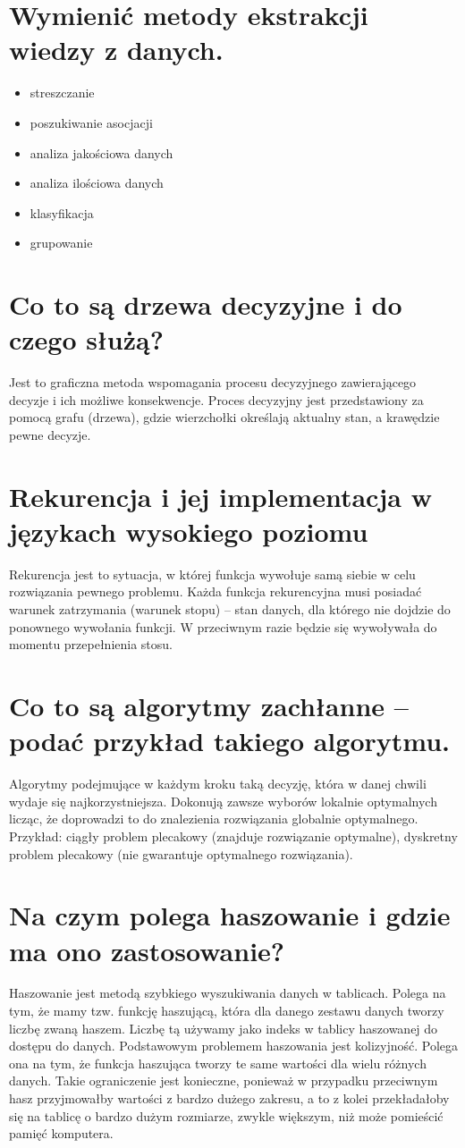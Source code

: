 \documentclass[12pt,a4paper]{article}
\begin{document}
	\section{Wymienić metody ekstrakcji wiedzy z danych.}
	\begin{itemize}
		\item streszczanie
		\item poszukiwanie asocjacji
		\item analiza jakościowa danych
		\item analiza ilościowa danych
		\item klasyfikacja
		\item grupowanie
	\end{itemize}

	\section{Co to są drzewa decyzyjne i do czego służą?}
	Jest to graficzna metoda wspomagania procesu decyzyjnego zawierającego decyzje i ich możliwe konsekwencje. Proces decyzyjny jest przedstawiony za pomocą grafu (drzewa), gdzie wierzchołki określają aktualny stan, a krawędzie pewne decyzje.

	\section{Rekurencja i jej implementacja w językach wysokiego poziomu}
	Rekurencja jest to sytuacja, w której funkcja wywołuje samą siebie w celu rozwiązania pewnego problemu. Każda funkcja rekurencyjna musi posiadać warunek zatrzymania (warunek stopu) – stan danych, dla którego nie dojdzie do ponownego wywołania funkcji. W przeciwnym razie będzie się wywoływała do momentu przepełnienia stosu.

	\section{Co to są algorytmy zachłanne – podać przykład takiego algorytmu.}
	Algorytmy podejmujące w każdym kroku taką decyzję, która w danej chwili wydaje się najkorzystniejsza. Dokonują zawsze wyborów lokalnie optymalnych licząc, że doprowadzi to do znalezienia rozwiązania globalnie optymalnego. Przykład: ciągły problem plecakowy (znajduje rozwiązanie optymalne), dyskretny problem plecakowy (nie gwarantuje optymalnego rozwiązania).

	\section{Na czym polega haszowanie i gdzie ma ono zastosowanie?}
	Haszowanie jest metodą szybkiego wyszukiwania danych w tablicach. Polega na tym, że mamy tzw. funkcję haszującą, która dla danego zestawu danych tworzy liczbę zwaną haszem. Liczbę tą używamy jako indeks w tablicy haszowanej do dostępu do danych. Podstawowym problemem haszowania jest kolizyjność. Polega ona na tym, że funkcja haszująca tworzy te same wartości dla wielu różnych danych. Takie ograniczenie jest konieczne, ponieważ w przypadku przeciwnym hasz przyjmowałby wartości z bardzo dużego zakresu, a to z kolei przekładałoby się na tablicę o bardzo dużym rozmiarze, zwykle większym, niż może pomieścić pamięć komputera.
\end{document}
